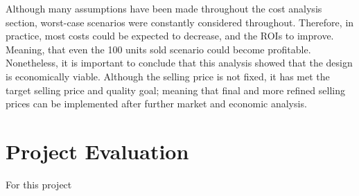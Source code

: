 \documentclass[a4paper,11pt]{article}
\begin{document}
Although many assumptions have been made throughout the cost analysis section, worst-case scenarios were constantly considered throughout. Therefore, in practice, most costs could be expected to decrease, and the ROIs to improve. Meaning, that even the 100 units sold scenario could become profitable. Nonetheless, it is important to conclude that this analysis showed that the design is economically viable. Although the selling price is not fixed, it has met the target selling price and quality goal; meaning that final and more refined selling prices can be implemented after further market and economic analysis. 

\section{Project Evaluation}

For this project


\sloppy



\nocite{shi}
\end{document}
